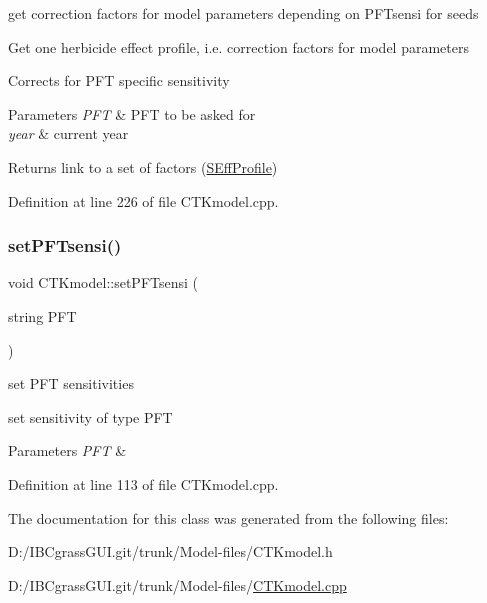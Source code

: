 get correction factors for model parameters depending on P\+F\+Tsensi for seeds 

Get one herbicide effect profile, i.\+e. correction factors for model parameters

Corrects for P\+FT specific sensitivity 
\begin{DoxyParams}{Parameters}
{\em P\+FT} & P\+FT to be asked for \\
\hline
{\em year} & current year \\
\hline
\end{DoxyParams}
\begin{DoxyReturn}{Returns}
link to a set of factors (\mbox{\hyperlink{struct_s_eff_profile}{S\+Eff\+Profile}}) 
\end{DoxyReturn}


Definition at line 226 of file C\+T\+Kmodel.\+cpp.

\mbox{\label{class_c_t_kmodel_aa6c4ebbda118cc0fc523c69ceff75908}} 
\subsubsection{\texorpdfstring{setPFTsensi()}{setPFTsensi()}}
{\footnotesize\ttfamily void C\+T\+Kmodel\+::set\+P\+F\+Tsensi (\begin{DoxyParamCaption}\item[{string}]{P\+FT }\end{DoxyParamCaption})\hspace{0.3cm}{\ttfamily [static]}}



set P\+FT sensitivities 

set sensitivity of type P\+FT 
\begin{DoxyParams}{Parameters}
{\em P\+FT} & \\
\hline
\end{DoxyParams}


Definition at line 113 of file C\+T\+Kmodel.\+cpp.



The documentation for this class was generated from the following files\+:\begin{DoxyCompactItemize}
\item 
D\+:/\+I\+B\+Cgrass\+G\+U\+I.\+git/trunk/\+Model-\/files/C\+T\+Kmodel.\+h\item 
D\+:/\+I\+B\+Cgrass\+G\+U\+I.\+git/trunk/\+Model-\/files/\mbox{\hyperlink{_c_t_kmodel_8cpp}{C\+T\+Kmodel.\+cpp}}\end{DoxyCompactItemize}

